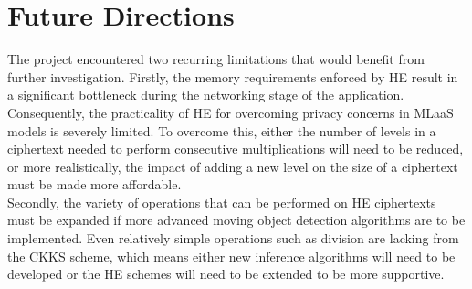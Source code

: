 \setlength{\leftskip}{0cm}





\section{Future Directions}
\setlength{\leftskip}{0.25cm}
\indent \indent
The project encountered two recurring limitations that would benefit from further investigation. Firstly, the memory requirements enforced by HE result in a significant bottleneck during the networking stage of the application. Consequently, the practicality of HE for overcoming privacy concerns in MLaaS models is severely limited. To overcome this, either the number of levels in a ciphertext needed to perform consecutive multiplications will need to be reduced, or more realistically, the impact of adding a new level on the size of a ciphertext must be made more affordable.
\smallskip \\ \indent
Secondly, the variety of operations that can be performed on HE ciphertexts must be expanded if more advanced moving object detection algorithms are to be implemented. Even relatively simple operations such as division are lacking from the CKKS scheme, which means either new inference algorithms will need to be developed or the HE schemes will need to be extended to be more supportive.

\setlength{\leftskip}{0cm}

